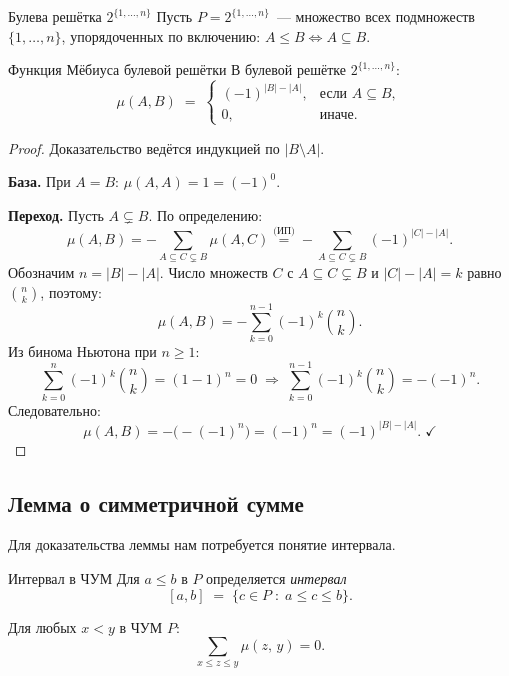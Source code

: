 \begin{Example}{Булева решётка $2^{\{1,\ldots,n\}}$}{}
	Пусть $P = 2^{\{1,\ldots,n\}}$~--- множество всех подмножеств
	$\{1,\ldots,n\}$, упорядоченных по включению: $A \leq B \Leftrightarrow A \subseteq B$.
\end{Example}

\begin{Theorem}{Функция Мёбиуса булевой решётки}{}
	В булевой решётке $2^{\{1,\ldots,n\}}$:
	\[
	\mu(A,B)
	\;=\;
	\begin{cases}
		(-1)^{|B|-|A|}, & \text{если } A \subseteq B,\\
		0,              & \text{иначе.}
	\end{cases}
	\]
\end{Theorem}

\begin{proof}
	Доказательство ведётся индукцией по $|B \setminus A|$.
	
	\textbf{База.} При $A = B$: $\mu(A,A) = 1 = (-1)^0$.\;\checkmark
	
	\textbf{Переход.} Пусть $A \subsetneq B$. По определению:
	\[
	\mu(A,B)
	= -\sum_{A \subseteq C \subsetneq B}\mu(A,C)
	\stackrel{\text{(ИП)}}{=}
	-\sum_{A \subseteq C \subsetneq B}(-1)^{|C|-|A|}.
	\]
	Обозначим $n = |B|-|A|$. Число множеств $C$ с $A\subseteq C\subsetneq B$
	и $|C|-|A|=k$ равно $\binom{n}{k}$, поэтому:
	\[
	\mu(A,B)
	= -\sum_{k=0}^{n-1}(-1)^k\binom{n}{k}.
	\]
	Из бинома Ньютона при $n \geq 1$:
	\[
	\sum_{k=0}^{n}(-1)^k\binom{n}{k}
	= (1-1)^n = 0
	\;\Longrightarrow\;
	\sum_{k=0}^{n-1}(-1)^k\binom{n}{k}
	= -(-1)^n.
	\]
	Следовательно:
	\[
	\mu(A,B)
	= -\bigl(-(-1)^n\bigr)
	= (-1)^n
	= (-1)^{|B|-|A|}.\;\checkmark
	\]
\end{proof}

\subsection{Лемма о симметричной сумме}

Для доказательства леммы нам потребуется понятие интервала.

\begin{Definition}{Интервал в ЧУМ}{}
	Для $a \leq b$ в $P$ определяется \emph{интервал}
	\[
	[a,b] \;=\; \bigl\{c \in P \;:\; a \leq c \leq b\bigr\}.
	\]
\end{Definition}

\begin{Lemma}{}{}
	Для любых $x < y$ в ЧУМ $P$:
	\[
	\sum_{x \leq z \leq y} \mu(z,\, y) = 0.
	\]
\end{Lemma}

